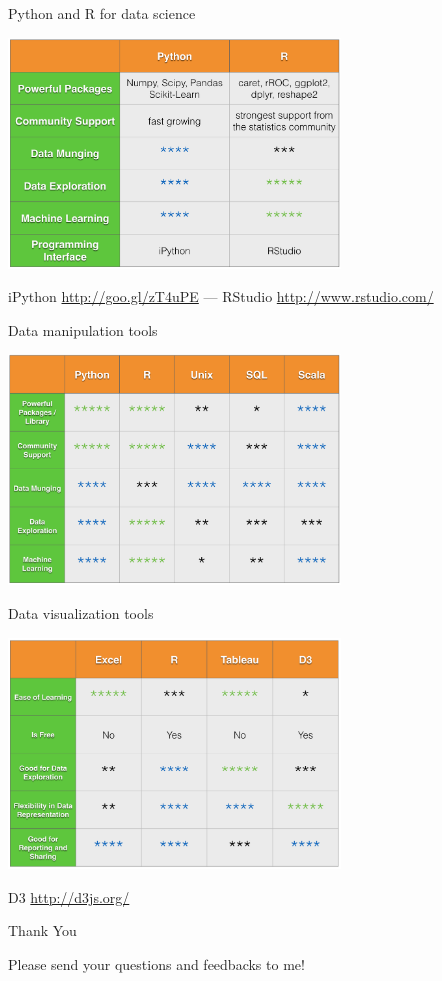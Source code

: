 \documentclass[10pt]{beamer}
\begin{document}
    \begin{frame}{Python and R for data science}
      \begin{center}
        \includegraphics[width=250pt]{../graphs/python_r}
      \end{center}
      {\footnotesize
        iPython \url{http://goo.gl/zT4uPE}
        --- 
        RStudio \url{http://www.rstudio.com/}
      }
    \end{frame}

    \begin{frame}{Data manipulation tools}
      \begin{center}
         \includegraphics[width=250pt]{../graphs/data_tools}
      \end{center}
    \end{frame}

    \begin{frame}{Data visualization tools}
      \begin{center}
         \includegraphics[width=250pt]{../graphs/data_visualization_tools}
      \end{center}
      {\footnotesize
        D3 \url{http://d3js.org/}
      }
    \end{frame}
     
    \begin{frame}{Thank You}
      \centerline{\large Please send your questions and feedbacks to me!}
    \end{frame}
\end{document}
